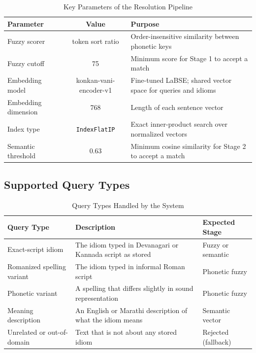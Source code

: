 \documentclass[12pt,a4paper]{article}
\begin{document}
\begin{table}[H]
\centering
\caption{Key Parameters of the Resolution Pipeline}
\label{tab:params}
\renewcommand{\arraystretch}{1.3}
\begin{tabularx}{\linewidth}{|l|c|X|}
\hline
\textbf{Parameter} & \textbf{Value} & \textbf{Purpose} \\
\hline
Fuzzy scorer & token sort ratio & Order-insensitive similarity between phonetic keys \\
\hline
Fuzzy cutoff & 75 & Minimum score for Stage 1 to accept a match \\
\hline
Embedding model & konkan-vani-encoder-v1 & Fine-tuned LaBSE; shared vector space for queries and idioms \\
\hline
Embedding dimension & 768 & Length of each sentence vector \\
\hline
Index type & \texttt{IndexFlatIP} & Exact inner-product search over normalized vectors \\
\hline
Semantic threshold & 0.63 & Minimum cosine similarity for Stage 2 to accept a match \\
\hline
\end{tabularx}
\end{table}

\subsection{Supported Query Types}
\begin{table}[H]
\centering
\caption{Query Types Handled by the System}
\label{tab:querytypes}
\renewcommand{\arraystretch}{1.3}
\begin{tabularx}{\linewidth}{|l|X|l|}
\hline
\textbf{Query Type} & \textbf{Description} & \textbf{Expected Stage} \\
\hline
Exact-script idiom & The idiom typed in Devanagari or Kannada script as stored & Fuzzy or semantic \\
\hline
Romanized spelling variant & The idiom typed in informal Roman script & Phonetic fuzzy \\
\hline
Phonetic variant & A spelling that differs slightly in sound representation & Phonetic fuzzy \\
\hline
Meaning description & An English or Marathi description of what the idiom means & Semantic vector \\
\hline
Unrelated or out-of-domain & Text that is not about any stored idiom & Rejected (fallback) \\
\hline
\end{tabularx}
\end{table}
\end{document}
